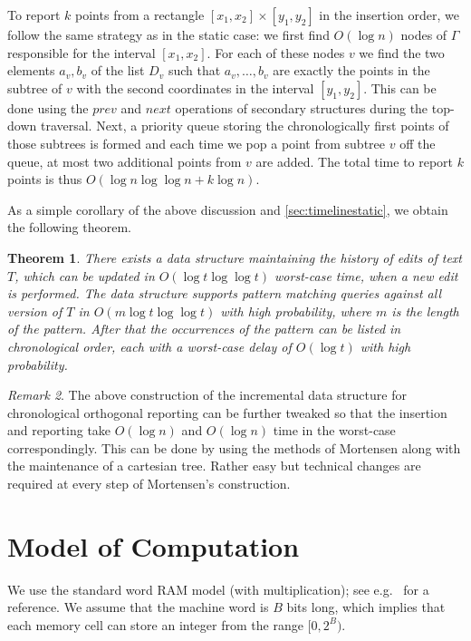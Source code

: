 \documentclass[a4paper]{article}
\newtheorem{theorem}{Theorem}[section]
\theoremstyle{remark}
\newtheorem{remark}[theorem]{Remark}
\newcommand{\mword}{B}
\begin{document}
To report $k$ points from a rectangle $[x_1,x_2]\times [y_1,y_2]$ in
the insertion order, we follow the same strategy as in the static
case: we first find $O(\log{n})$ nodes of $\Gamma$ responsible
for the interval $[x_1,x_2]$.
For each of these nodes $v$ we find the two elements $a_v,b_v$ of
the list $D_v$ such that $a_v,\ldots,b_v$ are exactly the points in the
subtree of $v$ with the second coordinates in the interval $[y_1,y_2]$.
This can be done using the $prev$ and $next$ operations of secondary structures
during the top-down traversal.
Next, a priority queue storing the chronologically first points
of those subtrees is formed and each time we pop a point from subtree $v$ off the queue,
at most two additional points from $v$ are added.
The total time to report $k$ points is thus $O(\log{n}\log{\log{n}}+k\log{n})$.

As a simple corollary of the above discussion and \cref{sec:timelinestatic},
we obtain the following theorem.

\begin{theorem}
There exists a data structure maintaining the history of edits of text $T$,
which can be updated in $O(\log{t}\log{\log{t}})$ worst-case time, when a new edit is performed.
The data structure supports pattern matching queries against all version of $T$ in $O(m \log{t}\log\log{t})$ with high probability, where $m$ is the length of the pattern.
After that the occurrences of the pattern can be listed in chronological order, each with a worst-case delay of $O(\log t)$ with high probability.
\end{theorem}

\begin{remark}
The above construction of the incremental data structure for chronological
orthogonal reporting can be further tweaked so that the insertion and reporting take
$O(\log{n})$ and $O(\log{n})$ time in the worst-case correspondingly.
This can be done by using the methods of Mortensen \cite{Mortensen:2003}
along with the maintenance of a cartesian tree.
Rather easy but technical changes are required at every step of
Mortensen's construction.
\end{remark}

\appendix

\section{Model of Computation}\label{app:model}
We use the standard word RAM model (with multiplication); see e.g.~\cite{DBLP:conf/stacs/Hagerup98} for a reference.
We assume that the machine word is $\mword$ bits long, which implies that each memory cell can store an integer from the range $[0, 2^{\mword})$.
\end{document}
